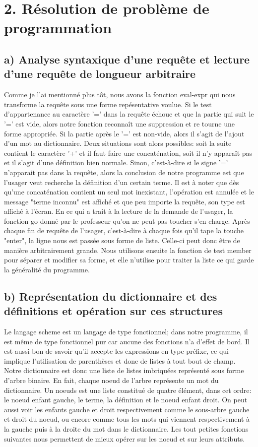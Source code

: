 \documentclass[french]{article}
\begin{document}
	\section{2. Résolution de problème de programmation}
		\subsection{a) Analyse syntaxique d’une requête et lecture d’une requête de longueur arbitraire}
			Comme je l'ai mentionné plus tôt, nous avons la fonction eval-expr qui nous transforme la requête sous une forme repésentative
		voulue. Si le test d'appartenance au caractère '=' dans la requête échoue et que la partie qui suit le '=' est vide, alors notre
		fonction reconnaît une suppression et re tourne une forme appropriée. Si la partie après le '=' est non-vide, alors il s'agit
		de l'ajout d'un mot au dictionnaire. Deux situations sont alors possibles: soit la suite contient le caractère '+' et il faut faire
		une concaténation, soit il n'y apparaît pas et il s'agit d'une définition bien normale. Sinon, c'est-à-dire si le signe '=' n'apparait
		pas dans la requête, alors la conclusion de notre programme est que l'usager veut recherche la définition d'un certain terme. Il est à noter
		que dès qu'une concaténation contient un seul mot inexistant, l'opération est annulée et le message "terme inconnu" est affiché et que peu importe
		la requête, son type est affiché à l'écran.
			En ce qui a trait à la lecture de la demande de l'usager, la fonction go donné par le professeur qu'on ne peut pas toucher s'en charge.
		Après chaque fin de requête de l'usager, c'est-à-dire à chaque fois qu'il tape la touche "enter", la ligne nous est passée sous forme
		de liste. Celle-ci peut donc être de manière arbitrairement grande. Nous utilisons ensuite la fonction de test member pour séparer 
		et modifier sa forme, et elle n'utilise pour traiter la liste ce qui garde la généralité du programme.
	
		\subsection{b) Représentation du dictionnaire et des définitions et opération sur ces structures}
			Le langage scheme est un langage de type fonctionnel; dans notre programme, il est même de type fonctionnel pur car aucune
		des fonctions n'a d'effet de bord. Il est aussi bon de savoir qu'il accepte les expressions en type préfixe, ce qui implique l'utilisation
		de parenthèses et donc de listes à tout bout de champ.
			Notre dictionnaire est donc une liste de listes imbriquées représenté sous forme d'arbre binaire. En fait, chaque noeud de l'arbre
		représente un mot du dictionnaire. Un noeuds est une liste constitué de quatre élément, dans cet ordre: le noeud enfant gauche,
		le terme, la définition et le noeud enfant droit. On peut aussi voir les enfants gauche et droit respectivement comme le sous-arbre
		gauche et droit du noeud, ou encore comme tous les mots qui viennent respectivement à la gauche puis à la droite du mot dans le dictionnaire. Les tout petites fonctions suivantes nous permettent de mieux opérer sur les noeud et sur leurs attributs.
			
\end{document}
